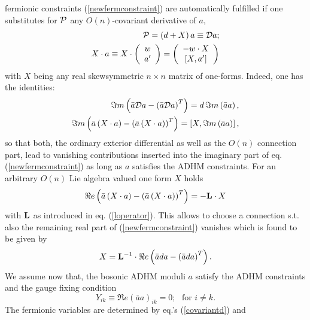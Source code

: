 \documentclass[a4paper,12pt]{article}
\begin{document}
fermionic constraints (\ref{newfermconstraint})
are automatically fulfilled if one substitutes for ${\cal P}$ 
any $O(n)$-covariant derivative of $a$, 
\begin{eqnarray}
{\cal P}=\left(d+X\right)a\equiv{\cal D}a; \nonumber \\
X\cdot a\equiv X\cdot 
\left( 
\begin{array}{c}
w \\
a'
\end{array}
\right)=\left(
\begin{array}{c}
-w\cdot X  \\
\left[ X,a' \right]
\end{array}
\right)       
\label{covariantd}
\end{eqnarray}
with $X$ being any real skewsymmetric $n \times n$ matrix 
of one-forms. Indeed, one has the identities:     
\begin{eqnarray}
\Im m \left(\bar{a}{\cal D}a-\left(\bar{a}{\cal D}a\right)^T\right) 
=d \, \Im m \left(\bar{a}a\right), \nonumber \\ 
\Im m\left(\bar{a}\left(X\cdot a\right)-
\left(\bar{a}\left(X\cdot a\right)\right)^T \right) =
\left[X,\Im m \left(\bar{a}a\right)\right],
\label{xproperty}
\end{eqnarray}
so that both, the ordinary exterior differential as well as 
the $O(n)$ connection part, lead to vanishing contributions 
inserted into the imaginary part of eq. 
(\ref{newfermconstraint}) as long as $a$ satisfies the ADHM 
constraints. For an arbitrary $O(n)$ Lie 
algebra valued one form $X$ holds 
\begin{equation}
\Re e \left(\bar{a}\left(X\cdot a\right)-
\left(\bar{a}\left(X\cdot a\right)\right)^T \right)=-{\bf L}\cdot X 
\nonumber 
\end{equation}
with ${\bf L}$ as introduced in eq. (\ref{loperator}). This allows 
to choose a connection s.t. also the remaining real part of 
(\ref{newfermconstraint}) vanishes which is found to be given by 
\begin{equation}
X={\bf L}^{-1}\cdot \Re e \left(\bar{a}da-
\left(\bar{a}da\right)^T\right).
\label{xchoice}
\end{equation}    
We assume now that, the bosonic ADHM moduli $a$ satisfy the ADHM
constraints  and the gauge 
fixing condition 
\begin{equation}
Y_{ik}\equiv \Re e \left(\bar{a}a\right)_{ik}= 0; \,\,\,\, \mbox{for} \, \, 
i\neq k. \nonumber 
\end{equation}
The fermionic variables are determined by eq.'s (\ref{covariantd}) and 
\end{document}
